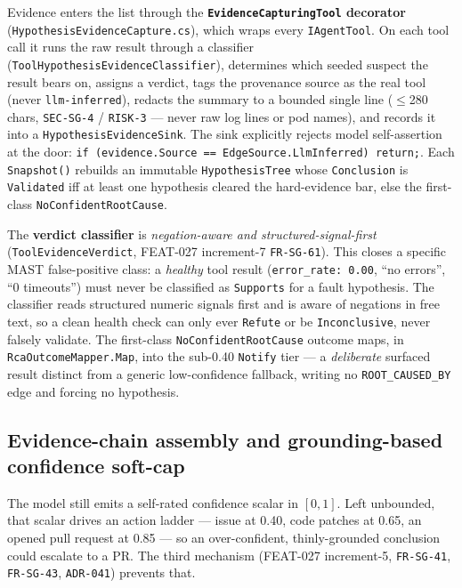 \documentclass[11pt]{article}
\begin{document}
Evidence enters the list through the \textbf{\texttt{EvidenceCapturingTool}
decorator} (\texttt{HypothesisEvidenceCapture.cs}), which wraps every
\texttt{IAgentTool}. On each tool call it runs the raw result through a
classifier (\texttt{ToolHypothesisEvidenceClassifier}), determines which
seeded suspect the result bears on, assigns a verdict, tags the provenance
source as the real tool (never \texttt{llm-inferred}), redacts the summary to
a bounded single line ($\leq$280 chars, \texttt{SEC-SG-4} / \texttt{RISK-3}
--- never raw log lines or pod names), and records it into a
\texttt{HypothesisEvidenceSink}. The sink explicitly rejects model
self-assertion at the door:
\texttt{if (evidence.Source == EdgeSource.LlmInferred) return;}. Each
\texttt{Snapshot()} rebuilds an immutable \texttt{HypothesisTree} whose
\texttt{Conclusion} is \texttt{Validated} iff at least one hypothesis cleared
the hard-evidence bar, else the first-class \texttt{NoConfidentRootCause}.

The \textbf{verdict classifier} is \emph{negation-aware and
structured-signal-first} (\texttt{ToolEvidenceVerdict}, FEAT-027 increment-7
\texttt{FR-SG-61}). This closes a specific MAST false-positive class: a
\emph{healthy} tool result (\texttt{error\_rate: 0.00}, ``no errors'',
``0 timeouts'') must never be classified as \texttt{Supports} for a fault
hypothesis. The classifier reads structured numeric signals first and is aware
of negations in free text, so a clean health check can only ever
\texttt{Refute} or be \texttt{Inconclusive}, never falsely validate. The
first-class \texttt{NoConfidentRootCause} outcome maps, in
\texttt{RcaOutcomeMapper.Map}, into the sub-0.40 \texttt{Notify} tier --- a
\emph{deliberate} surfaced result distinct from a generic low-confidence
fallback, writing no \texttt{ROOT\_CAUSED\_BY} edge and forcing no hypothesis.

\subsection{Evidence-chain assembly and grounding-based confidence soft-cap}

The model still emits a self-rated confidence scalar in $[0,1]$. Left
unbounded, that scalar drives an action ladder --- issue at 0.40, code patches
at 0.65, an opened pull request at 0.85 --- so an over-confident,
thinly-grounded conclusion could escalate to a PR. The third mechanism
(FEAT-027 increment-5, \texttt{FR-SG-41}, \texttt{FR-SG-43},
\texttt{ADR-041}) prevents that.
\end{document}
